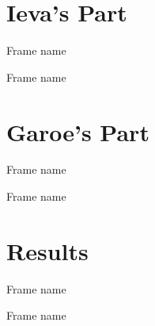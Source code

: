 \documentclass{beamer}
\begin{document}
\section{Ieva's Part}
\begin{frame}{Frame name}

\end{frame}


\begin{frame}{Frame name}

\end{frame}


\section{Garoe's Part}
\begin{frame}{Frame name}

\end{frame}


\begin{frame}{Frame name}

\end{frame}


\section{Results}
\begin{frame}{Frame name}
\end{frame}


\begin{frame}{Frame name}

\end{frame}



%
\end{document}
